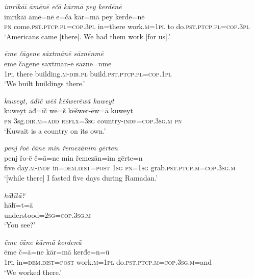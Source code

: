 \ea \label{ŽM.39}
\textit{imrīkāī āmēnē ečā kārmā pey kerdēnē} \\ 
\gll imrīkāī āmē=nē e=čā kār=mā pey kerdē=nē \\ 
 \textsc{pn} come\textsc{.pst}\textsc{.ptcp}\textsc{.pl}\textsc{=cop}\textsc{.3pl} in=there work\textsc{.m}\textsc{=\textsc{1pl}} to do\textsc{.pst}\textsc{.ptcp}\textsc{.pl}\textsc{=cop}\textsc{.3pl} \\ 
\glt `Americans came [there]. We had them work [for us].'
\z 
 
\ea \label{ŽM.40}
\textit{ēme čāgene sāxtmānē sāznēnmē} \\ 
\gll ēme čāgene sāxtmān-ē sāznē=nmē \\ 
 \textsc{1pl} there building\textsc{.m}\textsc{-dir}\textsc{.pl} build\textsc{.pst}\textsc{.ptcp}\textsc{.pl}\textsc{=cop}\textsc{.\textsc{1pl}} \\ 
\glt `We built buildings there.'
\z 
 
\ea \label{ŽM.42}
\textit{kuweyt, āđīč wēš kēšwerēwā kuweyt} \\ 
\gll kuweyt āđ=īč wē=š kēšwer-ēw=ā kuweyt \\ 
 \textsc{pn} 3sg\textsc{.dir}\textsc{.m}\textsc{=add} \textsc{reflx}\textsc{=3sg} country\textsc{-indf}\textsc{=cop}\textsc{.3sg}\textsc{.m} \textsc{pn} \\ 
\glt `Kuwait is a country on its own.'
\z 
 
\ea \label{ŽM.47}
\textit{penj řoē čāne min řemezānim gērten} \\ 
\gll penj řo-ē č=ā=ne min řemezān=im gērte=n \\ 
 five day\textsc{.m}\textsc{-indf} in=\textsc{dem.dist}\textsc{=\textsc{post}} \textsc{1sg} \textsc{pn}\textsc{=\textsc{1sg}} grab\textsc{.pst}\textsc{.ptcp}\textsc{.m}\textsc{=cop}\textsc{.3sg}\textsc{.m} \\ 
\glt `[while there] I fasted five days during Ramadan.'
\z 
 
\ea \label{ŽM.48}
\textit{hāɫītā?} \\ 
\gll hāɫī=t=ā \\ 
 understood\textsc{=\textsc{2sg}}\textsc{=cop}\textsc{.3sg}\textsc{.m} \\ 
\glt `You see?'
\z 
 
\ea \label{ŽM.50}
\textit{ēme čāne kārmā kerđenū} \\ 
\gll ēme č=ā=ne kār=mā kerđe=n=ū \\ 
 \textsc{1pl} in=\textsc{dem.dist}\textsc{=\textsc{post}} work\textsc{.m}\textsc{=\textsc{1pl}} do\textsc{.pst}\textsc{.ptcp}\textsc{.m}\textsc{=cop}\textsc{.3sg}\textsc{.m}=and \\ 
\glt `We worked there.'
\z 
 
